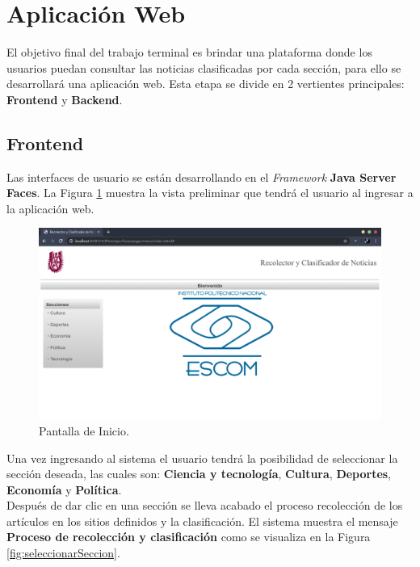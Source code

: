 \section{Aplicación Web}

El objetivo final del trabajo terminal es brindar una plataforma donde los usuarios puedan consultar las noticias clasificadas por cada sección, para ello se desarrollará una aplicación web. Esta etapa se divide en 2 vertientes principales: \textbf{Frontend} y \textbf{Backend}.\\

\subsection{Frontend}

Las interfaces de usuario se están desarrollando en el \textit{Framework} \textbf{Java Server Faces}. La Figura \ref{fig:PantallaInicio} muestra la vista preliminar que tendrá el usuario al ingresar a la aplicación web.\\

\begin{figure}[ht]
\centering
\includegraphics[scale=0.3]{imagenes/Aplicacion/PantallaInicio.png}
\caption{Pantalla de Inicio.}
\label{fig:PantallaInicio}
\end{figure}

Una vez ingresando al sistema el usuario tendrá la posibilidad de seleccionar la sección deseada, las cuales son: \textbf{Ciencia y tecnología}, \textbf{Cultura}, \textbf{Deportes}, \textbf{Economía} y \textbf{Política}.\\

Después de dar clic en una  sección se lleva acabado el proceso recolección de los artículos en los sitios definidos  y la clasificación. El sistema muestra el mensaje \textbf{Proceso de recolección y clasificación} como se visualiza en la Figura \ref{fig:seleccionarSeccion}.\\

